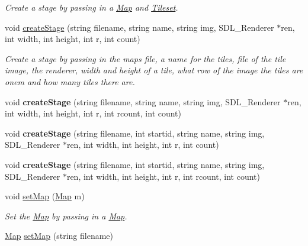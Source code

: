 \begin{DoxyCompactItemize}
\begin{DoxyCompactList}\small\item\em Create a stage by passing in a \hyperlink{classMap}{Map} and \hyperlink{classTileset}{Tileset}. \end{DoxyCompactList}\item 
void \hyperlink{classStage_ad552bc548e34ff668944a6fc20b2aa0d}{create\+Stage} (string filename, string name, string img, S\+D\+L\+\_\+\+Renderer $\ast$ren, int width, int height, int r, int count)\hypertarget{classStage_ad552bc548e34ff668944a6fc20b2aa0d}{}\label{classStage_ad552bc548e34ff668944a6fc20b2aa0d}

\begin{DoxyCompactList}\small\item\em Create a stage by passing in the maps file, a name for the tiles, file of the tile image, the renderer, width and height of a tile, what row of the image the tiles are onem and how many tiles there are. \end{DoxyCompactList}\item 
void {\bfseries create\+Stage} (string filename, string name, string img, S\+D\+L\+\_\+\+Renderer $\ast$ren, int width, int height, int r, int rcount, int count)\hypertarget{classStage_a871e4913cf2566a1a3a21c9d2e962648}{}\label{classStage_a871e4913cf2566a1a3a21c9d2e962648}

\item 
void {\bfseries create\+Stage} (string filename, int startid, string name, string img, S\+D\+L\+\_\+\+Renderer $\ast$ren, int width, int height, int r, int count)\hypertarget{classStage_a8ab003560188a4004ee497fd23692833}{}\label{classStage_a8ab003560188a4004ee497fd23692833}

\item 
void {\bfseries create\+Stage} (string filename, int startid, string name, string img, S\+D\+L\+\_\+\+Renderer $\ast$ren, int width, int height, int r, int rcount, int count)\hypertarget{classStage_a2d9071d75c90883539cd303c128a6b7d}{}\label{classStage_a2d9071d75c90883539cd303c128a6b7d}

\item 
void \hyperlink{classStage_a47a215785ca66ffae354c350aee1800e}{set\+Map} (\hyperlink{classMap}{Map} m)\hypertarget{classStage_a47a215785ca66ffae354c350aee1800e}{}\label{classStage_a47a215785ca66ffae354c350aee1800e}

\begin{DoxyCompactList}\small\item\em Set the \hyperlink{classMap}{Map} by passing in a \hyperlink{classMap}{Map}. \end{DoxyCompactList}\item 
\hyperlink{classMap}{Map} \hyperlink{classStage_a11b7cabe85812fda7513d14d6b21ff6a}{set\+Map} (string filename)\hypertarget{classStage_a11b7cabe85812fda7513d14d6b21ff6a}{}\label{classStage_a11b7cabe85812fda7513d14d6b21ff6a}


\end{DoxyCompactItemize}
